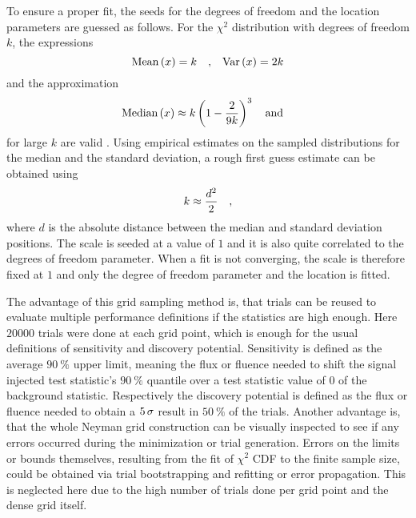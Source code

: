 To ensure a proper fit, the seeds for the degrees of freedom and the location parameters are guessed as follows.
For the $\chi^2$ distribution with degrees of freedom $k$, the expressions
\begin{equation}
  \text{Mean}\,(x) = k \quad\text{,}\quad
  \text{Var}\,(x) = 2k
\end{equation}
and the approximation
\begin{equation}
    \text{Median}\,(x) \approx k \left(1 - \frac{2}{9k}\right)^3 \quad\text{and}\quad
\end{equation}
for large $k$ are valid \cite{blobel2013statistische,Abramowitz:1974handbook}.
Using empirical estimates on the sampled distributions for the median and the standard deviation, a rough first guess estimate can be obtained using
\begin{equation}
  k \approx \frac{d^2}{2}
  \quad\text{,}
\end{equation}
where $d$ is the absolute distance between the median and standard deviation positions.
The scale is seeded at a value of $1$ and it is also quite correlated to the degrees of freedom parameter.
When a fit is not converging, the scale is therefore fixed at $1$ and only the degree of freedom parameter and the location is fitted.

The advantage of this grid sampling method is, that trials can be reused to evaluate multiple performance definitions if the statistics are high enough.
Here $\num{20000}$ trials were done at each grid point, which is enough for the usual definitions of sensitivity and discovery potential.
Sensitivity is defined as the average $\SI{90}{\percent}$ upper limit, meaning the flux or fluence needed to shift the signal injected test statistic's $\SI{90}{\percent}$ quantile over a test statistic value of $0$ of the background statistic.
Respectively the discovery potential is defined as the flux or fluence needed to obtain a $\num{5}\,\sigma$ result in $\SI{50}{\percent}$ of the trials.
Another advantage is, that the whole Neyman grid construction can be visually inspected to see if any errors occurred during the minimization or trial generation.
Errors on the limits or bounds themselves, resulting from the fit of $\chi^2$ CDF to the finite sample size, could be obtained via trial bootstrapping and refitting or error propagation.
This is neglected here due to the high number of trials done per grid point and the dense grid itself.


